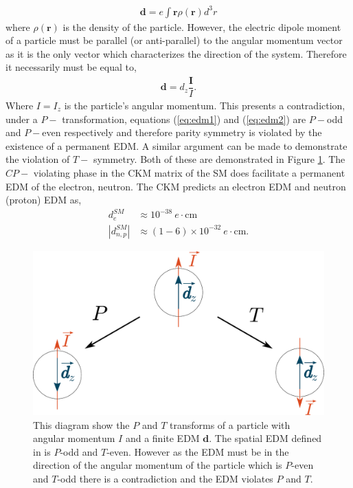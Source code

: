 \documentclass[10pt,a4paper, twoside, openright]{report}
\begin{document}
\begin{align} \label{eq:edm1}
\textbf{d} = e\int \textbf{r}\rho(\textbf{r})d^3r
\end{align}
where $\rho(\textbf{r})$ is the density of the particle. However, the electric dipole moment of a particle must be parallel (or anti-parallel) to the angular momentum vector as it is the only vector which characterizes the direction of the system. Therefore it necessarily must be equal to, 
\begin{align} \label{eq:edm2}
\textbf{d}  = d_z \dfrac{\textbf{I}}{I}.
\end{align}
Where $I = I_z$ is the particle's angular momentum. This presents a contradiction, under a  $P-$  transformation, equations (\ref{eq:edm1}) and (\ref{eq:edm2}) are $P-$odd and $P-$even respectively and therefore parity symmetry is violated by the existence of a permanent EDM. A similar argument can be made to demonstrate the violation of $T-$ symmetry. Both of these are demonstrated in Figure \ref{fig:ParityTimeEDM}. The $CP-$ violating phase in the CKM matrix of the SM does facilitate a permanent EDM of the electron, neutron. The CKM predicts an electron EDM\cite{Ng1996} and neutron (proton) EDM \cite{Seng2015} as,
\begin{align}
d_{e}^{SM} &\approx 10^{-38} \ e\cdot\text{cm} \\
|d_{n,p}^{SM}| &\approx (1-6) \times 10^{-32} \ e\cdot\text{cm}.
\end{align} 
\begin{figure}
\includegraphics[scale=0.3]{./figures/EDM.eps}
\caption[Parity and time reversal transforms of a permanent EDM]{\label{fig:ParityTimeEDM} This diagram show the $P$ and $T$ transforms of a particle with angular momentum $I$ and a finite EDM $\textbf{d}$. The spatial EDM defined in  is $P$-odd and $T$-even. However as the EDM must be in the direction of the angular momentum of the particle which is $P$-even and $T$-odd there is a contradiction and the EDM violates $P$ and $T$.}
\end{figure}
\end{document}
